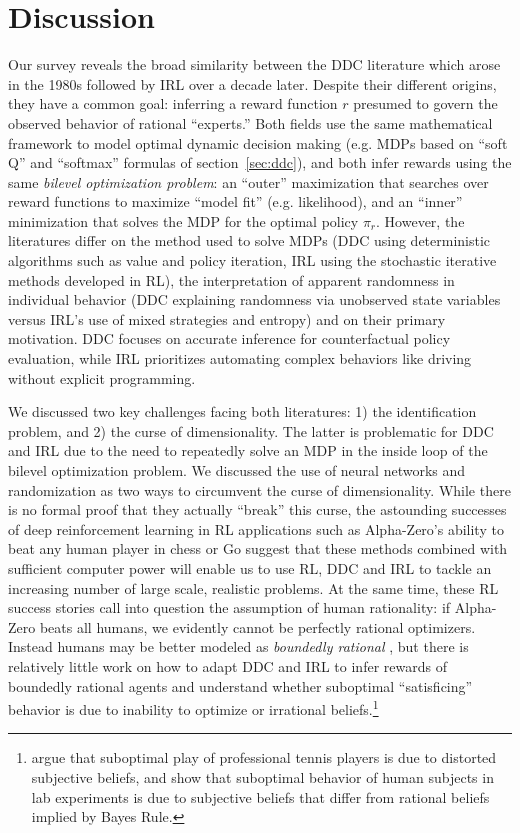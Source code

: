 \section{Discussion\label{sec:conclusion}}

Our survey reveals the broad similarity between the DDC literature which arose in the 1980s followed by IRL over a decade later.
Despite their different origins, they have a common goal: inferring a reward function $r$ presumed to govern the observed behavior of rational ``experts.''
Both fields use the same mathematical framework to model optimal dynamic decision making (e.g. MDPs based on ``soft Q'' and ``softmax'' formulas of section~\ref{sec:ddc}),
and both infer rewards using the same {\it bilevel optimization problem\/}: an ``outer'' maximization that searches over reward functions to maximize ``model fit''
(e.g. likelihood), and an ``inner'' minimization that solves the MDP for the optimal policy $\pi_r$.
However, the literatures differ on the method used to solve MDPs (DDC using deterministic algorithms
such as value and policy iteration, IRL using the stochastic iterative methods developed in RL), 
the interpretation of apparent randomness in individual behavior
 (DDC explaining randomness via unobserved state variables versus IRL's use of mixed strategies and entropy) and
on their primary motivation. DDC focuses on accurate inference for counterfactual policy evaluation, while IRL prioritizes automating complex behaviors 
like driving without explicit programming.

We discussed two key challenges facing both literatures: 1) the identification problem, and 2) the curse of dimensionality. 
The latter is problematic for DDC and IRL due to the need to repeatedly solve an MDP in the inside loop of the bilevel optimization problem. We discussed
the use of neural networks and randomization as two  ways to  circumvent the curse of dimensionality. While
there is no formal proof that they actually ``break'' this curse, the
astounding successes of deep reinforcement learning in RL applications such as Alpha-Zero's ability to beat any human player in chess or Go suggest  that these 
methods combined with sufficient computer power will enable us to use RL, DDC and IRL to tackle an increasing number of large scale, realistic problems. 
At the same time, these RL success stories call into question the assumption of human rationality: if Alpha-Zero beats all humans, 
we evidently cannot be perfectly rational optimizers. Instead humans may be better modeled as {\it boundedly rational\/} \citep{Simon:1957}, but 
there is relatively little work on how to adapt DDC and IRL to infer rewards of boundedly rational agents and understand whether suboptimal ``satisficing'' behavior
is due to inability to optimize or irrational beliefs.\footnote{\footnotesize \citet{tennis:2025} argue that
suboptimal play of professional tennis players is due to distorted subjective beliefs, and \citet{whoismorebayesian:2025} show that suboptimal behavior of
human subjects in lab experiments is due to subjective beliefs that differ from rational beliefs implied by Bayes Rule.}

